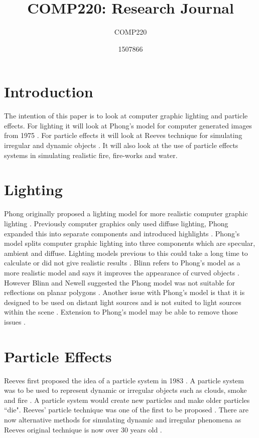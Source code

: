 \documentclass{scrartcl}
\title{COMP220: Research Journal}
\subtitle{COMP220}
\author{1507866}
\begin{document}
	
\maketitle
{}
	
\section{Introduction}
The intention of this paper is to look at computer graphic lighting and particle effects. For lighting it will look at Phong's model for computer generated images from 1975 \cite{Phong}.
For particle effects it will look at Reeves technique for simulating irregular and dynamic objects \cite{Reeves}. It will also look at the use of particle effects systems in simulating realistic fire, fire-works and water.  

\section{Lighting}
Phong originally proposed a lighting model for more realistic computer graphic lighting \cite{Phong}.  Previously computer graphics only used diffuse lighting, Phong expanded this into separate components and introduced highlights \cite{Kajiya, BlinnNewell, Phong}. Phong's model splits computer graphic lighting into three components which are specular, ambient and diffuse. Lighting models previous to this could take a long time to calculate or did not give realistic results \cite{Phong}. 
Blinn refers to Phong's model as a more realistic model and says it improves the appearance of curved objects \cite{Blinn}. However Blinn and Newell suggested the Phong model was not suitable for reflections on planar polygons \cite{BlinnNewell}. Another issue with Phong's model is that it is designed to be used on distant light sources and is not suited to light sources within the scene \cite{Whitted}. Extension to Phong's model may be able to remove those issues \cite{BlinnNewell, Whitted}.

	
\section{Particle Effects}
Reeves first proposed the idea of a particle system in 1983 \cite{Reeves}. A particle system was to be used to represent dynamic or irregular objects such as clouds, smoke and fire \cite{Reeves, Lei, Nishita}. A particle system would create new particles and make older particles ``die". Reeves' particle technique was one of the first to be proposed \cite{Pegoraro}. There are now alternative methods for simulating dynamic and irregular phenomena as Reeves original technique is now over 30 years old \cite{Nishita, Pegoraro}.
\end{document}
